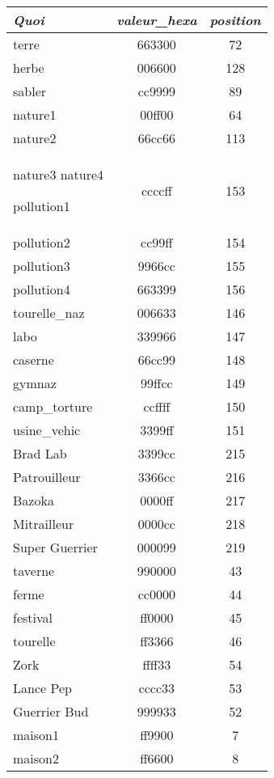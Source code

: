 \documentclass[11pt,french]{article}
\newcommand{\yo}[1]{\textit{\Large #1}}
\begin{document}
\begin{tabular}{|l|c|c}
 \hline
	\yo{Quoi} & \yo{valeur_hexa} & \yo{position} \\
  	\hline
	
	terre	& 663300 & 72\\
	herbe	& 006600 & 128\\
	sabler	& cc9999 & 89\\

	nature1 & 00ff00 & 64\\
	nature2 & 66cc66 & 113\\
	nature3
	nature4
	
	pollution1 	& ccccff & 153\\
	pollution2	& cc99ff & 154\\ 
	pollution3	& 9966cc & 155\\
	pollution4	& 663399 & 156\\

	tourelle_naz 	& 006633 & 146\\
	labo		& 339966 & 147\\
	caserne		& 66cc99 & 148\\
	gymnaz		& 99ffcc & 149\\
	camp_torture	& ccffff & 150\\
	usine_vehic	& 3399ff & 151\\

	Brad Lab	& 3399cc & 215\\
	Patrouilleur	& 3366cc & 216\\
	Bazoka		& 0000ff & 217\\
	Mitrailleur	& 0000cc & 218\\
	Super Guerrier	& 000099 & 219\\
	
	taverne		& 990000 & 43\\ 
	ferme		& cc0000 & 44\\
	festival	& ff0000 & 45\\
	tourelle	& ff3366 & 46\\

	Zork		& ffff33 & 54\\
	Lance Pep	& cccc33 & 53\\
	Guerrier Bud	& 999933 & 52\\


	maison1		& ff9900 & 7\\
	maison2		& ff6600 & 8\\
	
	

\hline
\end{tabular}
\end{document}
